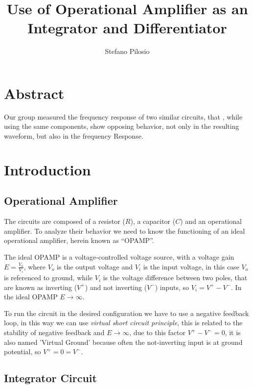 \documentclass[a4paper,twocolumn]{article}
\begin{document}
\title{Use of Operational Amplifier as  an Integrator and Differentiator}
\author{{Stefano Pilosio}}

\maketitle

\section{Abstract}
Our group measured the frequency response of two similar circuits, that , while using the same components, show opposing behavior, not only in the resulting waveform, but also in the frequency Response.

\section{Introduction}

\subsection{Operational Amplifier} 

The circuits are composed of a resistor ($R$), a capacitor ($C$) and an operational amplifier. To analyze their behavior we need to know the functioning of an ideal operational amplifier, herein known as ``OPAMP''.

The ideal OPAMP is a voltage-controlled voltage source, with a voltage gain $E = \frac{V_o}{V_i}$, where $V_o$ is the output voltage and $V_i$ is the input voltage, in this case $V_o$ is referenced to ground, while $V_i$ is the voltage difference between two poles, that are known as inverting ($V^+$) and not inverting ($V^-$) inputs, so $V_i=V^+-V^-$. In the ideal OPAMP $E\to\infty$.

To run the circuit in the desired configuration we have to use a negative feedback loop, in this way we can use \emph{virtual short circuit principle}, this is related to the stability of negative feedback and $E\to\infty$, due to this factor $V^+-V^-=0$, it is also named 'Virtual Ground' because often the not-inverting input is at ground potential, so $V^+=0=V^-$.

\subsection{Integrator Circuit}

%     
\end{document}
